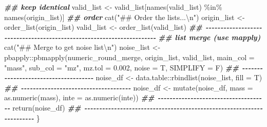 \documentclass[
]{article}
\newenvironment{Shaded}{\begin{snugshade}}{\end{snugshade}}
\newcommand{\AttributeTok}[1]{\textcolor[rgb]{0.77,0.63,0.00}{#1}}
\newcommand{\DocumentationTok}[1]{\textcolor[rgb]{0.56,0.35,0.01}{\textbf{\textit{#1}}}}
\newcommand{\FloatTok}[1]{\textcolor[rgb]{0.00,0.00,0.81}{#1}}
\newcommand{\FunctionTok}[1]{\textcolor[rgb]{0.00,0.00,0.00}{#1}}
\newcommand{\NormalTok}[1]{#1}
\newcommand{\OtherTok}[1]{\textcolor[rgb]{0.56,0.35,0.01}{#1}}
\newcommand{\SpecialCharTok}[1]{\textcolor[rgb]{0.00,0.00,0.00}{#1}}
\newcommand{\StringTok}[1]{\textcolor[rgb]{0.31,0.60,0.02}{#1}}
\begin{document}
\begin{Shaded}
\begin{Highlighting}[]
    \DocumentationTok{\#\# keep identical}
\NormalTok{    valid\_list }\OtherTok{\textless{}{-}}\NormalTok{ valid\_list[}\FunctionTok{names}\NormalTok{(valid\_list) }\SpecialCharTok{\%in\%} \FunctionTok{names}\NormalTok{(origin\_list)]}
    \DocumentationTok{\#\# order}
    \FunctionTok{cat}\NormalTok{(}\StringTok{"\#\# Order the lists...}\SpecialCharTok{\textbackslash{}n}\StringTok{"}\NormalTok{)}
\NormalTok{    origin\_list }\OtherTok{\textless{}{-}} \FunctionTok{order\_list}\NormalTok{(origin\_list)}
\NormalTok{    valid\_list }\OtherTok{\textless{}{-}} \FunctionTok{order\_list}\NormalTok{(valid\_list)}
    \DocumentationTok{\#\# {-}{-}{-}{-}{-}{-}{-}{-}{-}{-}{-}{-}{-}{-}{-}{-}{-}{-}{-}{-}{-}{-}{-}{-}{-}{-}{-}{-}{-}{-}{-}{-}{-}{-}{-}{-}{-}{-}{-}{-}{-}{-}{-}{-}{-}{-}{-}{-}{-}{-}{-}{-}{-}{-}{-}{-}{-}{-}{-}{-}{-}{-}{-}{-}{-}{-}{-}{-}{-}{-} }
    \DocumentationTok{\#\# list merge (use mapply)}
    \FunctionTok{cat}\NormalTok{(}\StringTok{"\#\# Merge to get noise list}\SpecialCharTok{\textbackslash{}n}\StringTok{"}\NormalTok{)}
\NormalTok{    noise\_list }\OtherTok{\textless{}{-}}\NormalTok{ pbapply}\SpecialCharTok{::}\FunctionTok{pbmapply}\NormalTok{(numeric\_round\_merge, origin\_list, valid\_list,}
      \AttributeTok{main\_col =} \StringTok{"mass"}\NormalTok{, }\AttributeTok{sub\_col =} \StringTok{"mz"}\NormalTok{,}
      \AttributeTok{mz.tol =} \FloatTok{0.002}\NormalTok{, }\AttributeTok{noise =}\NormalTok{ T, }\AttributeTok{SIMPLIFY =}\NormalTok{ F)}
    \DocumentationTok{\#\# {-}{-}{-}{-}{-}{-}{-}{-}{-}{-}{-}{-}{-}{-}{-}{-}{-}{-}{-}{-}{-}{-}{-}{-}{-}{-}{-}{-}{-}{-}{-}{-}{-}{-}{-}{-}{-} }
\NormalTok{    noise\_df }\OtherTok{\textless{}{-}}\NormalTok{ data.table}\SpecialCharTok{::}\FunctionTok{rbindlist}\NormalTok{(noise\_list, }\AttributeTok{fill =}\NormalTok{ T)}
    \DocumentationTok{\#\# {-}{-}{-}{-}{-}{-}{-}{-}{-}{-}{-}{-}{-}{-}{-}{-}{-}{-}{-}{-}{-}{-}{-}{-}{-}{-}{-}{-}{-}{-}{-}{-}{-}{-}{-}{-}{-} }
\NormalTok{    noise\_df }\OtherTok{\textless{}{-}} \FunctionTok{mutate}\NormalTok{(noise\_df, }\AttributeTok{mass =} \FunctionTok{as.numeric}\NormalTok{(mass), }\AttributeTok{inte =} \FunctionTok{as.numeric}\NormalTok{(inte))}
    \DocumentationTok{\#\# {-}{-}{-}{-}{-}{-}{-}{-}{-}{-}{-}{-}{-}{-}{-}{-}{-}{-}{-}{-}{-}{-}{-}{-}{-}{-}{-}{-}{-}{-}{-}{-}{-}{-}{-}{-}{-} }
    \FunctionTok{return}\NormalTok{(noise\_df)}
    \DocumentationTok{\#\# {-}{-}{-}{-}{-}{-}{-}{-}{-}{-}{-}{-}{-}{-}{-}{-}{-}{-}{-}{-}{-}{-}{-}{-}{-}{-}{-}{-}{-}{-}{-}{-}{-}{-}{-}{-}{-}{-}{-}{-}{-}{-}{-}{-}{-}{-}{-}{-}{-}{-}{-}{-}{-}{-}{-}{-}{-}{-}{-}{-}{-}{-}{-}{-}{-}{-}{-}{-}{-}{-} }
\NormalTok{  \}}

\end{Highlighting}
\end{Shaded}
\end{document}

